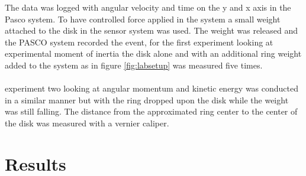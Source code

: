 \documentclass[11pt]{article}
\begin{document}
The data was logged with angular velocity and time on the y and x axis in the Pasco system. 
To have controlled force applied in the system a small weight attached to the disk in the sensor system was used. The weight was released and the PASCO system recorded the event, for the first 
experiment looking at experimental moment of inertia the disk alone and with an additional ring weight added to the system as in figure \ref{fig:labsetup} was measured five times.\\\\
experiment two looking at angular momentum and kinetic energy was conducted in a similar manner but with the ring dropped upon the disk while the weight was still falling. 
The distance from the approximated ring center to the center of the disk was measured with a vernier caliper.     

\newpage
\section{Results}

\end{document}
